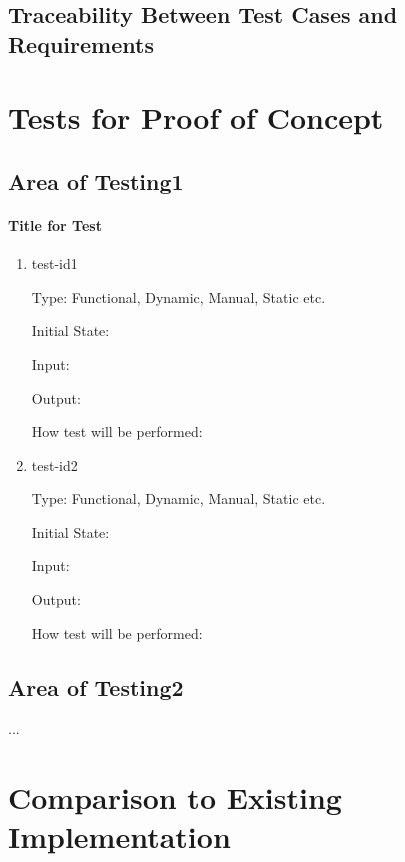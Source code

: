 \documentclass[12pt, titlepage]{article}
\begin{document}
\subsection{Traceability Between Test Cases and Requirements}

\section{Tests for Proof of Concept}

\subsection{Area of Testing1}
		
\paragraph{Title for Test}

\begin{enumerate}

\item{test-id1\\}

Type: Functional, Dynamic, Manual, Static etc.
					
Initial State: 
					
Input: 
					
Output: 
					
How test will be performed: 
					
\item{test-id2\\}

Type: Functional, Dynamic, Manual, Static etc.
					
Initial State: 
					
Input: 
					
Output: 
					
How test will be performed: 

\end{enumerate}

\subsection{Area of Testing2}

...

	
\section{Comparison to Existing Implementation}	
				
\end{document}
